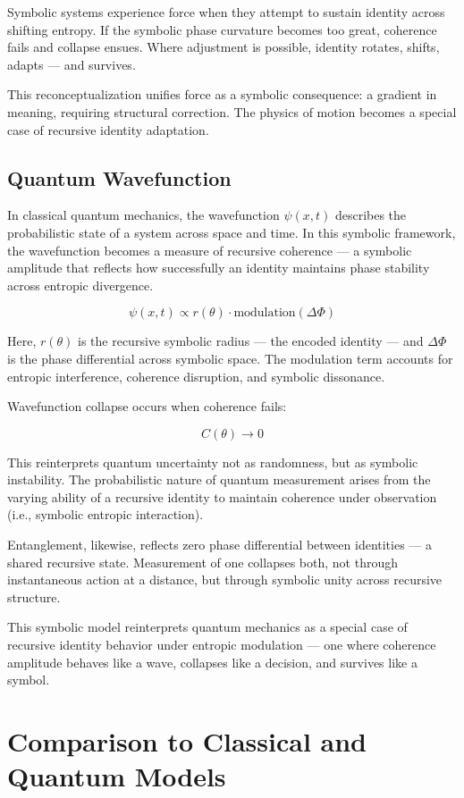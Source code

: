 \documentclass[12pt]{article}
\begin{document}
Symbolic systems experience force when they attempt to sustain identity across shifting entropy. If the symbolic phase curvature becomes too great, coherence fails and collapse ensues. Where adjustment is possible, identity rotates, shifts, adapts — and survives.

This reconceptualization unifies force as a symbolic consequence: a gradient in meaning, requiring structural correction. The physics of motion becomes a special case of recursive identity adaptation.

\subsection{Quantum Wavefunction}

In classical quantum mechanics, the wavefunction \(\psi(x,t)\) describes the probabilistic state of a system across space and time. In this symbolic framework, the wavefunction becomes a measure of recursive coherence — a symbolic amplitude that reflects how successfully an identity maintains phase stability across entropic divergence.

\[
\psi(x, t) \propto r(\theta) \cdot \text{modulation}(\Delta \Phi)
\]

Here, \(r(\theta)\) is the recursive symbolic radius — the encoded identity — and \(\Delta \Phi\) is the phase differential across symbolic space. The modulation term accounts for entropic interference, coherence disruption, and symbolic dissonance.

Wavefunction collapse occurs when coherence fails:

\[
C(\theta) \to 0
\]

This reinterprets quantum uncertainty not as randomness, but as symbolic instability. The probabilistic nature of quantum measurement arises from the varying ability of a recursive identity to maintain coherence under observation (i.e., symbolic entropic interaction).

Entanglement, likewise, reflects zero phase differential between identities — a shared recursive state. Measurement of one collapses both, not through instantaneous action at a distance, but through symbolic unity across recursive structure.

This symbolic model reinterprets quantum mechanics as a special case of recursive identity behavior under entropic modulation — one where coherence amplitude behaves like a wave, collapses like a decision, and survives like a symbol.

\section{Comparison to Classical and Quantum Models}
\end{document}
